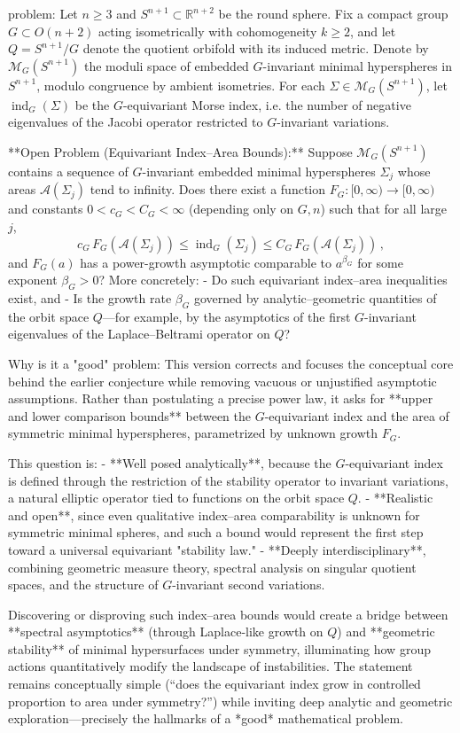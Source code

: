 problem:  
Let \(n \ge 3\) and \(S^{n+1} \subset \mathbb{R}^{n+2}\) be the round sphere.  
Fix a compact group \( G \subset O(n+2)\) acting isometrically with cohomogeneity \(k \ge 2\), and let \(Q = S^{n+1}/G\) denote the quotient orbifold with its induced metric.  
Denote by \( \mathcal{M}_G(S^{n+1})\) the moduli space of embedded \(G\)-invariant minimal hyperspheres in \(S^{n+1}\), modulo congruence by ambient isometries.  
For each \(\Sigma \in \mathcal{M}_G(S^{n+1})\), let \(\operatorname{ind}_G(\Sigma)\) be the \(G\)-equivariant Morse index, i.e. the number of negative eigenvalues of the Jacobi operator restricted to \(G\)-invariant variations.

**Open Problem (Equivariant Index–Area Bounds):**  
Suppose \( \mathcal{M}_G(S^{n+1})\) contains a sequence of \(G\)-invariant embedded minimal hyperspheres \(\Sigma_j\) whose areas \(\mathcal{A}(\Sigma_j)\) tend to infinity.  
Does there exist a function \(F_G\colon [0,\infty)\to[0,\infty)\) and constants \(0<c_G<C_G<\infty\) (depending only on \(G,n\)) such that for all large \(j\),  
\[
c_G\,F_G(\mathcal{A}(\Sigma_j)) \le \operatorname{ind}_G(\Sigma_j) \le C_G\,F_G(\mathcal{A}(\Sigma_j))\,,
\]
and \(F_G(a)\) has a power-growth asymptotic comparable to \(a^{\beta_G}\) for some exponent \(\beta_G>0\)?  
More concretely: 
- Do such equivariant index–area inequalities exist, and 
- Is the growth rate \(\beta_G\) governed by analytic–geometric quantities of the orbit space \(Q\)—for example, by the asymptotics of the first \(G\)-invariant eigenvalues of the Laplace–Beltrami operator on \(Q\)?  

Why is it a "good" problem:  
This version corrects and focuses the conceptual core behind the earlier conjecture while removing vacuous or unjustified asymptotic assumptions.  
Rather than postulating a precise power law, it asks for **upper and lower comparison bounds** between the \(G\)-equivariant index and the area of symmetric minimal hyperspheres, parametrized by unknown growth \(F_G\).  

This question is:
- **Well posed analytically**, because the \(G\)-equivariant index is defined through the restriction of the stability operator to invariant variations, a natural elliptic operator tied to functions on the orbit space \(Q\).  
- **Realistic and open**, since even qualitative index–area comparability is unknown for symmetric minimal spheres, and such a bound would represent the first step toward a universal equivariant "stability law."  
- **Deeply interdisciplinary**, combining geometric measure theory, spectral analysis on singular quotient spaces, and the structure of \(G\)-invariant second variations.  

Discovering or disproving such index–area bounds would create a bridge between **spectral asymptotics** (through Laplace-like growth on \(Q\)) and **geometric stability** of minimal hypersurfaces under symmetry, illuminating how group actions quantitatively modify the landscape of instabilities.  
The statement remains conceptually simple (“does the equivariant index grow in controlled proportion to area under symmetry?”) while inviting deep analytic and geometric exploration—precisely the hallmarks of a *good* mathematical problem.